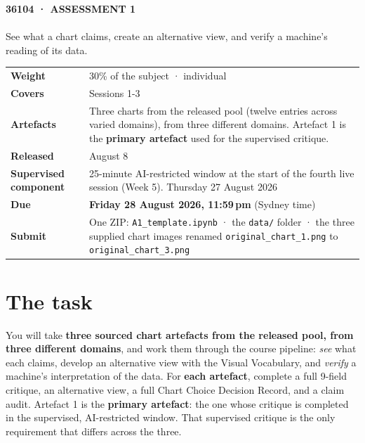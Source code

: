 \documentclass[11pt,a4paper]{article}
\newcommand{\labelbox}[1]{\colorbox{panel}{\texttt{\small #1}}}
\begin{document}
{\color{coral}\bfseries\small 36104 · ASSESSMENT 1}\\[0.2em]
\\[0.4em]
{\large\color{mist} See what a chart claims, create an alternative view, and verify a machine's reading of its data.}

\vspace{0.9em}
\begin{tabularx}{\textwidth}{@{}l X@{}}
\toprule
\textbf{Weight} & 30\% of the subject · individual \\
\textbf{Covers} & Sessions 1-3 \\
\textbf{Artefacts} & Three charts from the released pool (twelve entries across varied domains), from three different domains. Artefact 1 is the \textbf{primary artefact} used for the supervised critique. \\
\textbf{Released} & August 8 \\
\textbf{Supervised component} & 25-minute AI-restricted window at the start of the fourth live session (Week 5). Thursday 27 August 2026 \\
\textbf{Due} & \textbf{Friday 28 August 2026, 11:59\,pm} (Sydney time) \\
\textbf{Submit} & One ZIP: \labelbox{A1\_template.ipynb} · the \labelbox{data/} folder · the three supplied chart images renamed \labelbox{original\_chart\_1.png} to \labelbox{original\_chart\_3.png} \\
\bottomrule
\end{tabularx}

\section*{The task}

You will take \textbf{three sourced chart artefacts from the released pool,
from three different domains}, and work them through the course pipeline: \emph{see}
what each claims, develop an alternative view with the Visual Vocabulary, and
\emph{verify} a machine's interpretation of the data. For \textbf{each artefact},
complete a full 9-field critique, an alternative view, a full Chart Choice
Decision Record, and a claim audit. Artefact 1 is the \textbf{primary artefact}:
the one whose critique is completed in the supervised, AI-restricted window.
That supervised critique is the only requirement that differs across the three.
\end{document}
